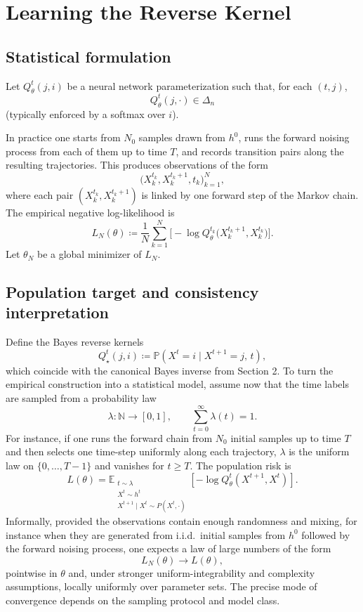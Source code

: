 \documentclass[11pt]{article}
\begin{document}
\section{Learning the Reverse Kernel}
\subsection{Statistical formulation}
Let $Q_\theta^t(j,i)$ be a neural network parameterization such that, for each $(t,j)$,
\[
Q_\theta^t(j,\cdot)\in\Delta_n
\]
(typically enforced by a softmax over $i$).

In practice one starts from $N_0$ samples drawn from $h^0$, runs the forward noising process from each of them up to time $T$, and records transition pairs along the resulting trajectories. This produces observations of the form
\[
\big(X_k^{t_k},X_k^{t_k+1},t_k\big)_{k=1}^N,
\]
where each pair $(X_k^{t_k},X_k^{t_k+1})$ is linked by one forward step of the Markov chain.
The empirical negative log-likelihood is
\begin{equation}
\label{eq:empirical-loss-user}
L_N(\theta)
\coloneqq
\frac1N\sum_{k=1}^N
\Big[-\log Q_\theta^{t_k}\!\big(X_k^{t_k+1},X_k^{t_k}\big)\Big].
\end{equation}
Let $\theta_N$ be a global minimizer of $L_N$.

\subsection{Population target and consistency interpretation}
Define the Bayes reverse kernels
\[
Q_\star^t(j,i)\coloneqq \mathbb P(X^t=i\mid X^{t+1}=j,\,t),
\]
which coincide with the canonical Bayes inverse from Section 2.
To turn the empirical construction into a statistical model, assume now that the time labels are sampled from a probability law
\[
\lambda:\mathbb N\to[0,1],\qquad \sum_{t=0}^{\infty}\lambda(t)=1.
\]
For instance, if one runs the forward chain from $N_0$ initial samples up to time $T$ and then selects one time-step uniformly along each trajectory, $\lambda$ is the uniform law on $\{0,\dots,T-1\}$ and vanishes for $t\geq T$.
The population risk is
\[
L(\theta)=\mathbb E_{\substack{t\sim\lambda\\X^t\sim h^t\\X^{t+1}\mid X^t\sim P(X^t,\cdot)}}\!\left[-\log Q_\theta^{t}(X^{t+1},X^t)\right].
\]
Informally, provided the observations contain enough randomness and mixing, for instance when they are generated from i.i.d.\ initial samples from $h^0$ followed by the forward noising process, one expects a law of large numbers of the form
\[
L_N(\theta)\to L(\theta),
\]
pointwise in $\theta$ and, under stronger uniform-integrability and complexity assumptions, locally uniformly over parameter sets. The precise mode of convergence depends on the sampling protocol and model class.
\end{document}
